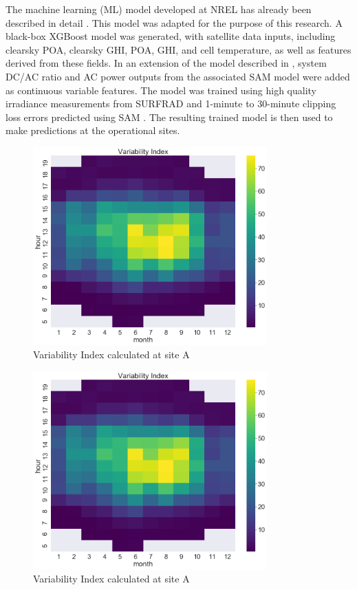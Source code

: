 \documentclass[conference]{IEEEtran}
\begin{document}
The machine learning (ML) model developed at NREL has already been described in detail \cite{Anderson2020}. This model was adapted for the purpose of this research. A black-box XGBoost model was generated, with satellite data inputs, including clearsky POA, clearsky GHI, POA, GHI, and cell temperature, as well as features derived from these fields. In an extension of the model described in \cite{Anderson2020}, system DC/AC ratio and AC power outputs from the associated SAM model were added as continuous variable features. The model was trained using high quality irradiance measurements from SURFRAD \cite{Augustine2000} and 1-minute to 30-minute clipping loss errors predicted using SAM \cite{Freeman2018}. The resulting trained model is then used to make predictions at the operational sites.

\begin{figure}[htbp]
\centerline{\includegraphics[width=9cm]{DCS_VI_heatmap.png}}
\caption{Variability Index calculated at site A}
\label{fig:irradiance-and-power}
\end{figure}

\begin{figure}[htbp]
\centerline{\includegraphics[width=9cm]{DCS_VI_heatmap.png}}
\caption{Variability Index calculated at site A}
\label{fig:irradiance-and-power}
\end{figure}
\end{document}
